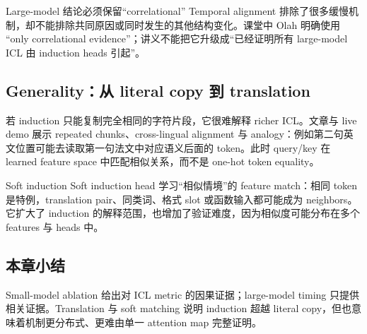 \begin{warningbox}{Large-model 结论必须保留“correlational”}
Temporal alignment 排除了很多缓慢机制，却不能排除共同原因或同时发生的其他结构变化。课堂中 Olah 明确使用 “only correlational evidence”；讲义不能把它升级成“已经证明所有 large-model ICL 由 induction heads 引起”。
\end{warningbox}


\subsection{Generality：从 literal copy 到 translation}

若 induction 只能复制完全相同的字符片段，它很难解释 richer ICL。文章与 live demo 展示 repeated chunks、cross-lingual alignment 与 analogy：例如第二句英文位置可能去读取第一句法文中对应语义后面的 token。此时 query/key 在 learned feature space 中匹配相似关系，而不是 one-hot token equality。


\begin{importantbox}{Soft induction}
Soft induction head 学习“相似情境”的 feature match：相同 token 是特例，translation pair、同类词、格式 slot 或函数输入都可能成为 neighbors。它扩大了 induction 的解释范围，也增加了验证难度，因为相似度可能分布在多个 features 与 heads 中。
\end{importantbox}


\subsection{本章小结}

Small-model ablation 给出对 ICL metric 的因果证据；large-model timing 只提供相关证据。Translation 与 soft matching 说明 induction 超越 literal copy，但也意味着机制更分布式、更难由单一 attention map 完整证明。

